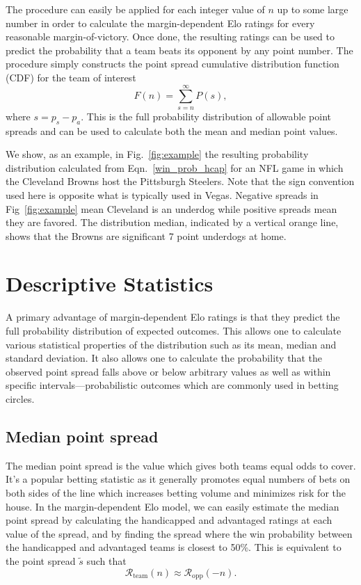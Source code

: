 \documentclass[aps,prc,reprint,amsmath,superscriptaddress]{revtex4-1}
\newcommand{\R}{\mathcal{R}}
\begin{document}
The procedure can easily be applied for each integer value of $n$ up to some large number in order to calculate the margin-dependent Elo ratings for every reasonable margin-of-victory.
Once done, the resulting ratings can be used to predict the probability that a team beats its opponent by any point number.
The procedure simply constructs the point spread cumulative distribution function (CDF) for the team of interest
\begin{equation}
  \label{cdf}
  F(n) = \sum_{s=n}^\infty P(s),
\end{equation}
where $s = p_s - p_a$.
This is the full probability distribution of allowable point spreads and can be used to calculate both the mean and median point values.

We show, as an example, in Fig.~\ref{fig:example} the resulting probability distribution calculated from Eqn.~\eqref{win_prob_hcap} for an NFL game in which the Cleveland Browns host the Pittsburgh Steelers. 
Note that the sign convention used here is opposite what is typically used in Vegas.
Negative spreads in Fig~\ref{fig:example} mean Cleveland is an underdog while positive spreads mean they are favored.
The distribution median, indicated by a vertical orange line, shows that the Browns are significant 7 point underdogs at home.

\section{Descriptive Statistics}

A primary advantage of margin-dependent Elo ratings is that they predict the full probability distribution of expected outcomes.
This allows one to calculate various statistical properties of the distribution such as its mean, median and standard deviation.
It also allows one to calculate the probability that the observed point spread falls above or below arbitrary values as well as within specific intervals---probabilistic outcomes which are commonly used in betting circles.

\subsection{Median point spread}

The median point spread is the value which gives both teams equal odds to cover.
It's a popular betting statistic as it generally promotes equal numbers of bets on both sides of the line which increases betting volume and minimizes risk for the house.
In the margin-dependent Elo model, we can easily estimate the median point spread by calculating the handicapped and advantaged ratings at each value of the spread, and by finding the spread where the win probability between the handicapped and advantaged teams is closest to 50\%.
This is equivalent to the point spread $\tilde{s}$ such that
\begin{equation}
  \R_\text{team}(n) \approx \R_\text{opp}(-n).
\end{equation}
\end{document}
